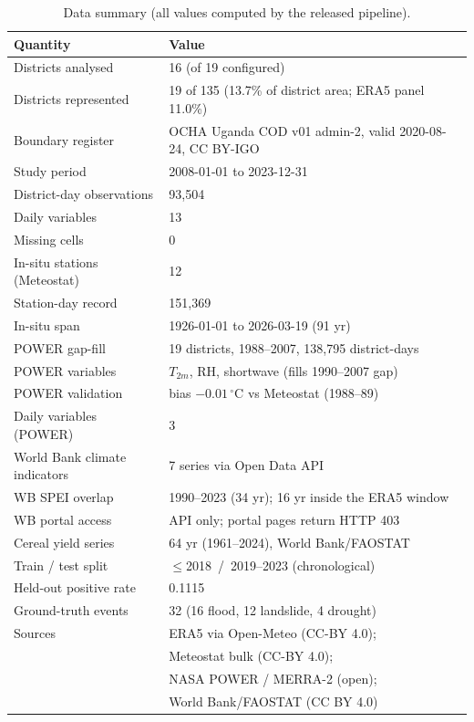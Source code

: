 \documentclass[preprint,12pt]{elsarticle}
\begin{document}
\begin{table}[h]
\centering\small
\caption{Data summary (all values computed by the released pipeline).}
\label{tab:data}
\begin{tabular}{ll}
\toprule
Quantity & Value \\
\midrule
Districts analysed & 16 (of 19 configured) \\
Districts represented & 19 of 135 (13.7\% of district area; ERA5 panel 11.0\%) \\
Boundary register & OCHA Uganda COD v01 admin-2, valid 2020-08-24, CC BY-IGO \\
Study period & 2008-01-01 to 2023-12-31 \\
District-day observations & 93{,}504 \\ 
Daily variables & 13 \\
Missing cells & 0 \\
In-situ stations (Meteostat) & 12 \\
Station-day record & 151{,}369 \\
In-situ span & 1926-01-01 to 2026-03-19 (91 yr) \\
POWER gap-fill & 19 districts, 1988--2007, 138{,}795 district-days \\
POWER variables & $T_{2m}$, RH, shortwave (fills 1990--2007 gap) \\
POWER validation & bias $-0.01$\,$^\circ$C vs Meteostat (1988--89) \\
Daily variables (POWER) & 3 \\
World Bank climate indicators & 7 series via Open Data API \\
WB SPEI overlap & 1990--2023 (34 yr); 16 yr inside the ERA5 window \\
WB portal access & API only; portal pages return HTTP 403 \\
Cereal yield series & 64 yr (1961--2024), World Bank/FAOSTAT \\
Train / test split & $\leq$2018 \,/\, 2019--2023 (chronological) \\
Held-out positive rate & 0.1115 \\
Ground-truth events & 32 (16 flood, 12 landslide, 4 drought) \\
Sources & ERA5 via Open-Meteo (CC-BY 4.0); \\ & Meteostat bulk (CC-BY 4.0); \\ & NASA POWER / MERRA-2 (open); \\ & World Bank/FAOSTAT (CC BY 4.0) \\
\bottomrule
\end{tabular}
\end{table}
\end{document}
